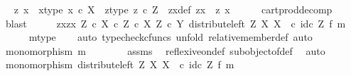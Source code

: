 \begin{isabellebody}
\ \isamarkupfalse%
\ z\ x\ \ x{\isacharunderscore}{\kern0pt}type{\isacharcolon}{\kern0pt}\ {\isachardoublequoteopen}x\ {\isasymin}\isactrlsub c\ X{\isachardoublequoteclose}\ \ z{\isacharunderscore}{\kern0pt}type{\isacharcolon}{\kern0pt}\ {\isachardoublequoteopen}z\ {\isasymin}\isactrlsub c\ Z{\isachardoublequoteclose}\ \ zx{\isacharunderscore}{\kern0pt}def{\isacharcolon}{\kern0pt}\ {\isachardoublequoteopen}zx\ {\isacharequal}{\kern0pt}\ {\isasymlangle}z{\isacharcomma}{\kern0pt}\ x{\isasymrangle}{\isachardoublequoteclose}\isanewline
\ \ \ \ \isamarkupfalse%
\ cart{\isacharunderscore}{\kern0pt}prod{\isacharunderscore}{\kern0pt}decomp\ \isamarkupfalse%
\ blast\isanewline
\ \ \isamarkupfalse%
\ \isamarkupfalse%
\ {\isachardoublequoteopen}{\isasymlangle}zx{\isacharcomma}{\kern0pt}zx{\isasymrangle}\ {\isasymin}\isactrlbsub {\isacharparenleft}{\kern0pt}Z\ {\isasymtimes}\isactrlsub c\ X{\isacharparenright}{\kern0pt}\ {\isasymtimes}\isactrlsub c\ Z\ {\isasymtimes}\isactrlsub c\ X\isactrlesub \ {\isacharparenleft}{\kern0pt}Z\ {\isasymtimes}\isactrlsub c\ Y{\isacharcomma}{\kern0pt}\ distribute{\isacharunderscore}{\kern0pt}left\ Z\ X\ X\ \ {\isasymcirc}\isactrlsub c\ {\isacharparenleft}{\kern0pt}id\isactrlsub c\ Z\ {\isasymtimes}\isactrlsub f\ m{\isacharparenright}{\kern0pt}{\isacharparenright}{\kern0pt}{\isachardoublequoteclose}\isanewline
\ \ \ \ \isamarkupfalse%
\ m{\isacharunderscore}{\kern0pt}type\isanewline
\ \ \isamarkupfalse%
\ {\isacharparenleft}{\kern0pt}auto{\isacharcomma}{\kern0pt}\ typecheck{\isacharunderscore}{\kern0pt}cfuncs{\isacharcomma}{\kern0pt}\ unfold\ relative{\isacharunderscore}{\kern0pt}member{\isacharunderscore}{\kern0pt}def{}{\isacharcomma}{\kern0pt}\ auto{\isacharparenright}{\kern0pt}\isanewline
\ \ \ \ \isamarkupfalse%
\ {\isachardoublequoteopen}monomorphism\ m{\isachardoublequoteclose}\isanewline
\ \ \ \ \ \ \isamarkupfalse%
\ assms\ \isamarkupfalse%
\ reflexive{\isacharunderscore}{\kern0pt}on{\isacharunderscore}{\kern0pt}def\ subobject{\isacharunderscore}{\kern0pt}of{\isacharunderscore}{\kern0pt}def{}\ \isamarkupfalse%
\ auto\isanewline
\ \ \ \ \isamarkupfalse%
\ \isamarkupfalse%
\ {\isachardoublequoteopen}monomorphism\ {\isacharparenleft}{\kern0pt}distribute{\isacharunderscore}{\kern0pt}left\ Z\ X\ X\ \ {\isasymcirc}\isactrlsub c\ {\isacharparenleft}{\kern0pt}id\isactrlsub c\ Z\ {\isasymtimes}\isactrlsub f\ m{\isacharparenright}{\kern0pt}{\isacharparenright}{\kern0pt}{\isachardoublequoteclose}\isanewline

\end{isabellebody}
